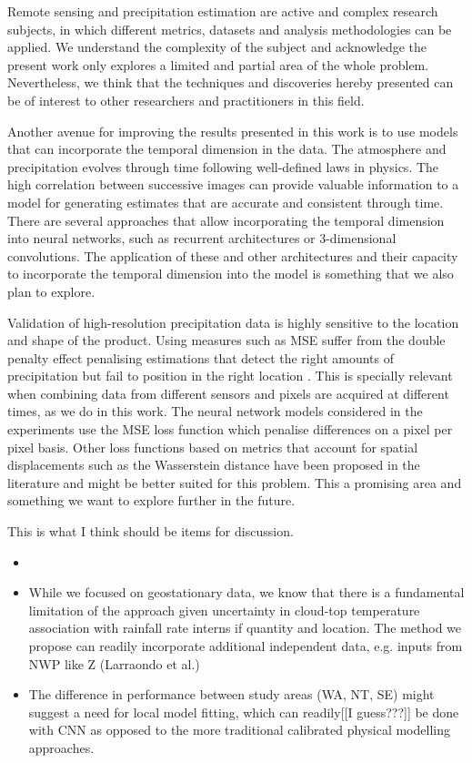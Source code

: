 \documentclass[3p,times]{elsarticle}
\begin{document}
Remote sensing and precipitation estimation are active and complex research subjects, in which different metrics, datasets and analysis methodologies can be applied. We understand the complexity of the subject and acknowledge the present work only explores a limited and partial area of the whole problem. Nevertheless, we think that the techniques and discoveries hereby presented can be of interest to other researchers and practitioners in this field.





Another avenue for improving the results presented in this work is to use models that can incorporate the temporal dimension in the data. The atmosphere and precipitation evolves through time following well-defined laws in physics. The high correlation between successive images can provide valuable information to a model for generating estimates that are accurate and consistent through time. There are several approaches that allow incorporating the temporal dimension into neural networks, such as recurrent architectures or 3-dimensional convolutions. The application of these and other architectures and their capacity to incorporate the temporal dimension into the model is something that we also plan to explore. 

Validation of high-resolution precipitation data is highly sensitive to the location and shape of the product. Using measures such as MSE suffer from the double penalty effect penalising estimations that detect the right amounts of precipitation but fail to position in the right location \citep{anthes1983regional,mass2002does}. This is specially relevant when combining data from different sensors and pixels are acquired at different times, as we do in this work. The neural network models considered in the experiments use the MSE loss function which penalise differences on a pixel per pixel basis. Other loss functions based on metrics that account for spatial displacements such as the Wasserstein distance have been proposed in the literature \citep{farchi2016using} and might be better suited for this problem. This a promising area and something we want to explore further in the future.


This is what I think should be items for discussion.
\begin{itemize}
    \item 
    
    \item While we focused on geostationary data, we know that there is a fundamental limitation of the approach given uncertainty in cloud-top temperature association with rainfall rate interns if quantity and location. The method we propose can readily incorporate additional independent data, e.g. inputs from NWP like Z (Larraondo et al.)  
    
    \item The difference in performance between study areas (WA, NT, SE) might suggest a need for local model fitting, which can readily[[I guess???]] be done with CNN as opposed to the more traditional calibrated physical modelling approaches.
\end{itemize}
\end{document}

